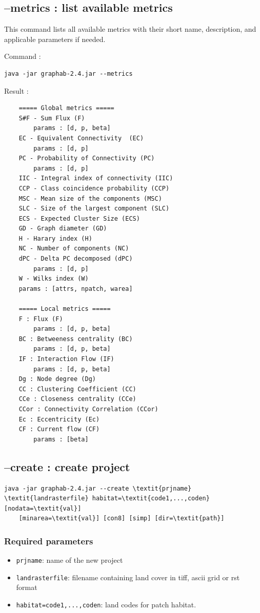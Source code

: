 \documentclass[a4paper,10pt]{report}
\begin{document}
\subsection{--metrics : list available metrics}
This command lists all available metrics with their short name, description, and applicable parameters if needed.

Command :
\begin{Verbatim}
java -jar graphab-2.4.jar --metrics
\end{Verbatim}
Result :
\begin{Verbatim}
	===== Global metrics =====
	S#F - Sum Flux (F)
		params : [d, p, beta]
	EC - Equivalent Connectivity  (EC)
		params : [d, p]
	PC - Probability of Connectivity (PC)
		params : [d, p]
	IIC - Integral index of connectivity (IIC)
	CCP - Class coincidence probability (CCP)
	MSC - Mean size of the components (MSC)
	SLC - Size of the largest component (SLC)
	ECS - Expected Cluster Size (ECS)
	GD - Graph diameter (GD)
	H - Harary index (H)
	NC - Number of components (NC)
	dPC - Delta PC decomposed (dPC)
		params : [d, p]
	W - Wilks index (W)
	params : [attrs, npatch, warea]
	
	===== Local metrics =====
	F : Flux (F)
		params : [d, p, beta]
	BC : Betweeness centrality (BC)
		params : [d, p, beta]
	IF : Interaction Flow (IF)
		params : [d, p, beta]
	Dg : Node degree (Dg)
	CC : Clustering Coefficient (CC)
	CCe : Closeness centrality (CCe)
	CCor : Connectivity Correlation (CCor)
	Ec : Eccentricity (Ec)
	CF : Current flow (CF)
		params : [beta]
\end{Verbatim}

\subsection{--create : create project}

\begin{Verbatim}[commandchars=\\\{\}]
java -jar graphab-2.4.jar --create \textit{prjname} \textit{landrasterfile} habitat=\textit{code1,...,coden} [nodata=\textit{val}] 
	[minarea=\textit{val}] [con8] [simp] [dir=\textit{path}]
\end{Verbatim}

\subsubsection{Required parameters}
\begin{itemize}
	\item \verb|prjname|: name of the new project
	\item \verb|landrasterfile|: filename containing land cover in tiff, ascii grid or rst format
	\item \verb|habitat=code1,...,coden|: land codes for patch habitat.
\end{itemize}
\end{document}
